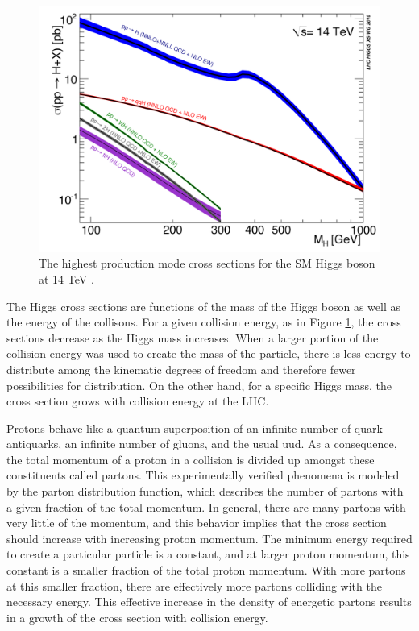 \begin{figure}[h!]
  \centering
  \includegraphics[width=5in]{images/14TeV_higgs_cross_sections.png}
  \caption[Higgs production cross sections.]
   {The highest production mode cross sections for the SM Higgs boson at 14 TeV \cite{crossbranchplots}.}
  \label{fig:hprodcross}
\end{figure}

The Higgs cross sections are functions of the mass of the Higgs boson as well as the energy of the collisons. For a given collision energy, as in Figure \ref{fig:hprodcross}, the cross sections decrease as the Higgs mass increases. When a larger portion of the collision energy was used to create the mass of the particle, there is less energy to distribute among the kinematic degrees of freedom and therefore fewer possibilities for distribution. On the other hand, for a specific Higgs mass, the cross section grows with collision energy at the LHC. 

Protons behave like a quantum superposition of an infinite number of quark-antiquarks, an infinite number of gluons, and the usual uud. As a consequence, the total momentum of a proton in a collision is divided up amongst these constituents called partons. This experimentally verified phenomena is modeled by the parton distribution function, which describes the number of partons with a given fraction of the total momentum. In general, there are many partons with very little of the momentum, and this behavior implies that the cross section should increase with increasing proton momentum. The minimum energy required to create a particular particle is a constant, and at larger proton momentum, this constant is a smaller fraction of the total proton momentum. With more partons at this smaller fraction, there are effectively more partons colliding with the necessary energy. This effective increase in the density of energetic partons results in a growth of the cross section with collision energy. 

